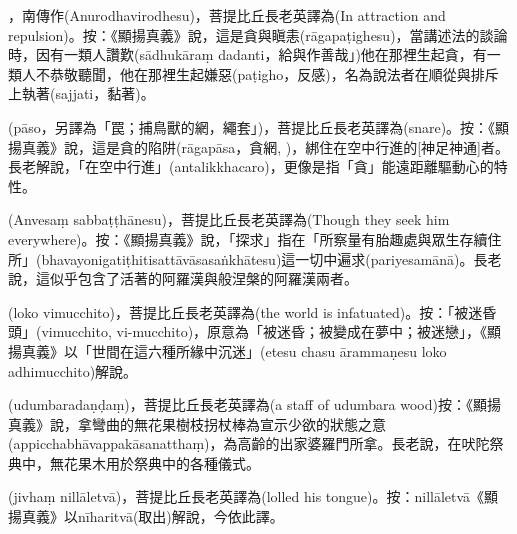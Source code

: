 \startitemgroup[noteitems]
\item{}，南傳作(Anurodhavirodhesu)，菩提比丘長老英譯為(In attraction and repulsion)。按：《顯揚真義》說，這是貪與瞋恚(rāgapaṭighesu)，當講述法的談論時，因有一類人讚歎(sādhukāraṃ dadanti，給與作善哉」)他在那裡生起貪，有一類人不恭敬聽聞，他在那裡生起嫌惡(paṭigho，反感)，名為說法者在順從與排斥上執著(sajjati，黏著)。
\stopitemgroup

\startitemgroup[noteitems]
\item{}(pāso，另譯為「罠；捕鳥獸的網，繩套」)，菩提比丘長老英譯為(snare)。按：《顯揚真義》說，這是貪的陷阱(rāgapāsa，貪網, )，綁住在空中行進的[神足神通]者。長老解說，「在空中行進」(antalikkhacaro)，更像是指「貪」能遠距離驅動心的特性。
\stopitemgroup

\startitemgroup[noteitems]
\item{}(Anvesaṃ sabbaṭṭhānesu)，菩提比丘長老英譯為(Though they seek him everywhere)。按：《顯揚真義》說，「探求」指在「所察量有胎趣處與眾生存續住所」(bhavayonigatiṭhitisattāvāsasaṅkhātesu)這一切中遍求(pariyesamānā)。長老說，這似乎包含了活著的阿羅漢與般涅槃的阿羅漢兩者。
\stopitemgroup

\startitemgroup[noteitems]
\item{}(loko vimucchito)，菩提比丘長老英譯為(the world is infatuated)。按：「被迷昏頭」(vimucchito, vi-mucchito)，原意為「被迷昏；被變成在夢中；被迷戀」，《顯揚真義》以「世間在這六種所緣中沉迷」(etesu chasu ārammaṇesu loko adhimucchito)解說。
\stopitemgroup

\startitemgroup[noteitems]
\item{}(udumbaradaṇḍaṃ)，菩提比丘長老英譯為(a staff of udumbara wood)按：《顯揚真義》說，拿彎曲的無花果樹枝拐杖棒為宣示少欲的狀態之意(appicchabhāvappakāsanatthaṃ)，為高齡的出家婆羅門所拿。長老說，在吠陀祭典中，無花果木用於祭典中的各種儀式。
\stopitemgroup

\startitemgroup[noteitems]
\item{}(jivhaṃ nillāletvā)，菩提比丘長老英譯為(lolled his tongue)。按：nillāletvā《顯揚真義》以nīharitvā(取出)解說，今依此譯。
\stopitemgroup


